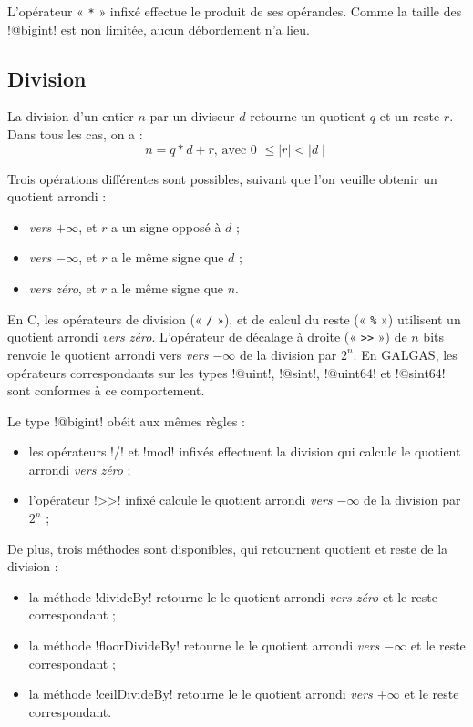 L'opérateur « \texttt{*} » infixé effectue le produit de ses opérandes. Comme la taille des \ggs!@bigint! est non limitée, aucun débordement n'a lieu.




\subsection{Division}



La division d'un entier $n$ par un diviseur $d$ retourne un quotient $q$ et un reste $r$. Dans tous les cas, on a :
\begin{equation*}
n = q * d + r\text{, avec 0 } \leqslant \mid r\mid < \mid d\mid
\end{equation*}

Trois opérations différentes sont possibles, suivant que l'on veuille obtenir un quotient arrondi :
\begin{itemize}
\item \emph{vers $+\infty$}, et $r$ a un signe opposé à $d$ ;
\item \emph{vers $-\infty$}, et $r$ a le même signe que $d$ ;
\item \emph{vers zéro}, et $r$ a le même signe que $n$.
\end{itemize}

En C, les opérateurs de division (« \texttt{/} »), et de calcul du reste (« \texttt{\%} ») utilisent un quotient arrondi \emph{vers zéro}. L'opérateur de décalage à droite (« \texttt{>{}>} ») de $n$ bits renvoie le quotient arrondi vers \emph{vers $-\infty$} de la division par $2^n$. En GALGAS, les opérateurs correspondants sur les types \ggs!@uint!, \ggs!@sint!, \ggs!@uint64! et \ggs!@sint64! sont conformes à ce comportement.

Le type \ggs!@bigint! obéit aux mêmes règles :
\begin{itemize}
\item les opérateurs \ggs!/! et \ggs!mod! infixés effectuent la division qui calcule le quotient arrondi \emph{vers zéro} ;
  \item l'opérateur \ggs!>>! infixé calcule le quotient arrondi \emph{vers $-\infty$} de la division par $2^n$ ;
\end{itemize}

De plus, trois méthodes sont disponibles, qui retournent quotient et reste de la division :
\begin{itemize}
  \item la méthode \ggs!divideBy! retourne le le quotient arrondi \emph{vers zéro} et le reste correspondant ;
  \item la méthode \ggs!floorDivideBy! retourne le le quotient arrondi \emph{vers $-\infty$} et le reste correspondant ;
  \item la méthode \ggs!ceilDivideBy! retourne le le quotient arrondi \emph{vers $+\infty$} et le reste correspondant.
\end{itemize}


